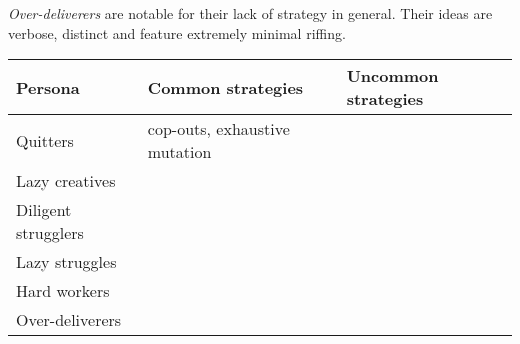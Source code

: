\emph{Over-deliverers} are notable for their lack of strategy in general. Their ideas are verbose, distinct and feature extremely minimal riffing. 

\begin{table*}
    \begin{tabular}{|l|l|l|}
        \hline
        \textbf{Persona} & \textbf{Common strategies} & \textbf{Uncommon strategies} \\
        \hline
        Quitters & cop-outs, exhaustive mutation & \\
        Lazy creatives & & \\
        Diligent strugglers & & \\
        Lazy struggles & & \\
        Hard workers & & \\
        Over-deliverers & & \\
        \hline
    \end{tabular}
\end{table*}
